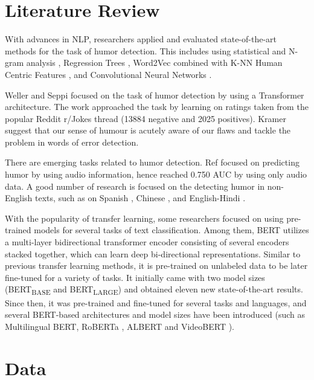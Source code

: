 \documentclass{article}
\begin{document}
\section{Literature Review}

With advances in NLP, researchers applied and evaluated state-of-the-art methods for the task of humor detection. This includes using statistical and N-gram analysis \cite{taylor2004computationally}, Regression Trees \cite{purandare2006humor}, Word2Vec combined with K-NN Human Centric Features \cite{yang2015humor}, and Convolutional Neural Networks \cite{chen2018humor} \cite{weller2019humor}. 

Weller and Seppi \cite{weller2019humor} focused on the task of humor detection by using a Transformer architecture. The work approached the task by learning on ratings taken from the popular Reddit r/Jokes thread (13884 negative and 2025 positives). 
Kramer \cite{kramer2021laugh} suggest that our sense of humour is acutely aware of our flaws and tackle the problem in words of error detection.

There are emerging tasks related to humor detection. Ref \cite{yang2019predicting} focused on predicting humor by using audio information, hence reached 0.750 AUC by using only audio data. A good number of research is focused on the detecting humor in non-English texts, such as on Spanish \cite{chiruzzo2019overview, ismailov2019humor, giudice2019aspie96}, Chinese \cite{yang2019predicting}, and English-Hindi \cite{khandelwal2018humor}.

With the popularity of transfer learning, some researchers focused on using pre-trained models for several tasks of text classification. 
Among them, BERT \cite{devlin2018bert} utilizes a multi-layer bidirectional transformer encoder consisting of several encoders stacked together, which can learn deep bi-directional representations. Similar to previous transfer learning methods, it is pre-trained on unlabeled data to be later fine-tuned for a variety of tasks. It initially came with two model sizes (BERT\textsubscript{BASE} and BERT\textsubscript{LARGE}) and obtained eleven new state-of-the-art results. Since then, it was pre-trained and fine-tuned for several tasks and languages, and several BERT-based architectures and model sizes have been introduced (such as Multilingual BERT, RoBERTa \cite{liu2019roberta}, ALBERT \cite{lan2019albert} and VideoBERT \cite{sun2019videobert}).

\section{Data}
\end{document}
